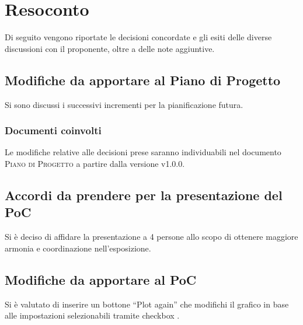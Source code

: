 \documentclass{article}
\begin{document}
\section{Resoconto}
\label{sec:resoconto}

Di seguito vengono riportate le decisioni concordate e gli esiti delle diverse discussioni con il proponente, oltre a 
delle note aggiuntive.

\subsection{Modifiche da apportare al Piano di Progetto}
\label{itm:1}

Si sono discussi i successivi incrementi per la pianificazione futura.

\subsubsection*{Documenti coinvolti}
Le modifiche relative alle decisioni prese saranno individuabili nel documento \textsc{Piano di Progetto} a partire 
dalla versione v1.0.0.

\subsection{Accordi da prendere per la presentazione del PoC}
\label{itm:2}

Si è deciso di affidare la presentazione a 4 persone allo scopo di ottenere maggiore armonia e coordinazione nell'esposizione.

\subsection{Modifiche da apportare al PoC}
\label{itm:3}

Si è valutato di inserire un bottone “Plot again” che modifichi il grafico in base alle impostazioni selezionabili tramite checkbox .
\end{document}
